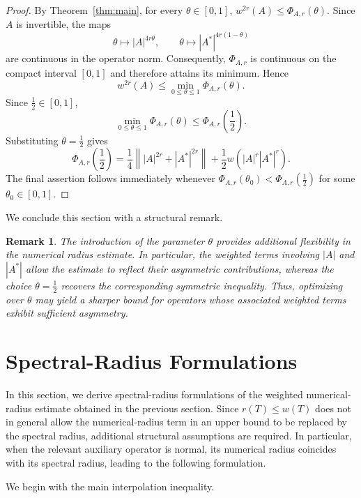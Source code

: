 \documentclass[final,1p,times]{elsarticle}
\newtheorem{rem}[thm]{Remark}
\newcommand{\norm}[1]{\left\lVert #1 \right\rVert}
\begin{document}
\begin{proof}
By Theorem~\ref{thm:main}, for every $\theta\in[0,1]$, $w^{2r}(A)\leq\Phi_{A,r}(\theta).$ Since $A$ is invertible, the maps
\[
\theta\longmapsto |A|^{4r\theta},
\qquad
\theta\longmapsto |A^*|^{4r(1-\theta)}
\]
are continuous in the operator norm. Consequently,
$\Phi_{A,r}$ is continuous on the compact interval $[0,1]$ and
therefore attains its minimum. Hence
\[
w^{2r}(A)
\leq
\min_{0\leq\theta\leq1}\Phi_{A,r}(\theta).
\]
Since $\frac12\in[0,1]$,
\[
\min_{0\leq\theta\leq1}\Phi_{A,r}(\theta)
\leq
\Phi_{A,r}\!\left(\frac12\right).
\]
Substituting $\theta=\frac12$ gives
\[
\Phi_{A,r}\!\left(\frac12\right)
=
\frac14\norm{|A|^{2r}+|A^*|^{2r}}
+
\frac12w\!\left(|A|^r|A^*|^r\right).
\]
The final assertion follows immediately whenever
$\Phi_{A,r}(\theta_0)<\Phi_{A,r}(\frac12)$ for some
$\theta_0\in[0,1]$.
\end{proof}

\medskip

We conclude this section with a structural remark.

\begin{rem}
The introduction of the parameter $\theta$ provides additional flexibility in
the numerical radius estimate. In particular, the weighted terms involving
$|A|$ and $|A^*|$ allow the estimate to reflect their asymmetric contributions,
whereas the choice $\theta=\tfrac12$ recovers the corresponding symmetric
inequality. Thus, optimizing over $\theta$ may yield a sharper bound for
operators whose associated weighted terms exhibit sufficient asymmetry.
\end{rem}

\section{Spectral-Radius Formulations}

In this section, we derive spectral-radius formulations of the weighted
numerical-radius estimate obtained in the previous section. Since
$r(T)\leq w(T)$ does not in general allow the numerical-radius term in
an upper bound to be replaced by the spectral radius, additional
structural assumptions are required. In particular, when the relevant
auxiliary operator is normal, its numerical radius coincides with its
spectral radius, leading to the following formulation.

\medskip

We begin with the main interpolation inequality.
\end{document}
